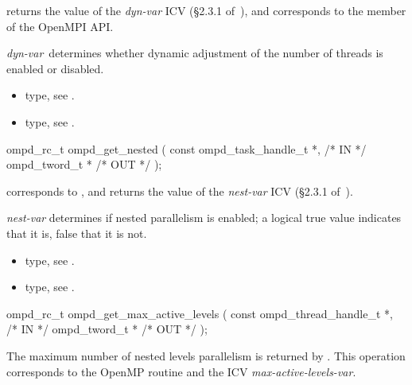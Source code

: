\descr
{} returns the value of the
\emph{dyn-var} ICV (\S2.3.1 of~\cite{OpenMP}),
and corresponds to the  member of the OpenMPI API.

\argdesc
\emph{dyn-var}~determines whether dynamic adjustment of the number
of threads is enabled or disabled.

\crossreferences
\begin{itemize}
	\item {} type, see .
	\item {} type, see .
\end{itemize}


\summary

\format
\cspecificstart
\begin{boxedcode}
ompd\_rc\_t ompd\_get\_nested (
  const ompd\_task\_handle\_t  *,                           /* IN */
  ompd\_tword\_t              *                                   /* OUT */
);
\end{boxedcode}
\cspecificend

\descr
{} corresponds to ,
and returns the value of the \emph{nest-var} ICV (\S2.3.1 of~\cite{OpenMP}).

\argdesc
\emph{nest-var} determines if nested parallelism is enabled;
a logical true value indicates that it is, false that it is not.

\crossreferences
\begin{itemize}
	\item {} type, see .
	\item {} type, see .
\end{itemize}


\summary

\format
\cspecificstart
\begin{boxedcode}
ompd\_rc\_t ompd\_get\_max\_active\_levels (
  const ompd\_thread\_handle\_t  *,                       /* IN */
  ompd\_tword\_t                *                                 /* OUT */
);
\end{boxedcode}
\cspecificend

\descr
The maximum number of nested levels parallelism is returned by
.
This operation corresponds to the OpenMP routine
and the ICV \emph{max-active-levels-var}.%

